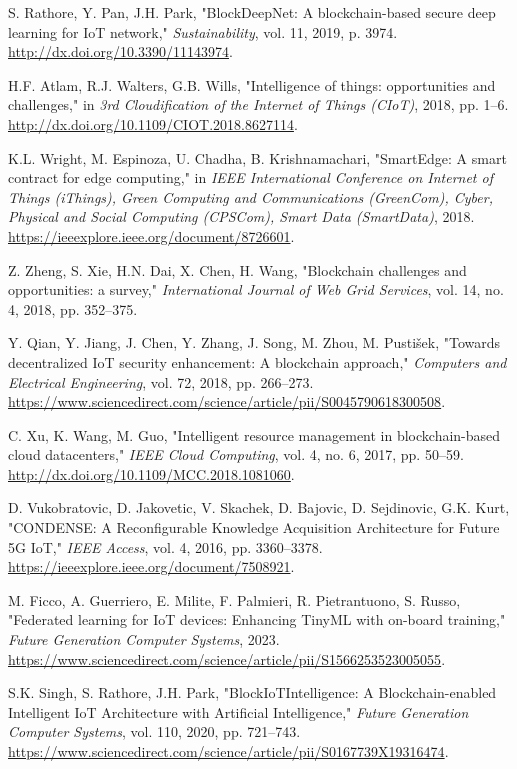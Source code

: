 \documentclass[12pt, oneside]{report}
\begin{document}

\begin{thebibliography}{20}

S. Rathore, Y. Pan, J.H. Park, "BlockDeepNet: A blockchain-based secure deep learning for IoT network," \textit{Sustainability}, vol. 11, 2019, p. 3974. \url{http://dx.doi.org/10.3390/11143974}.

H.F. Atlam, R.J. Walters, G.B. Wills, "Intelligence of things: opportunities and challenges," in \textit{3rd Cloudification of the Internet of Things (CIoT)}, 2018, pp. 1–6. \url{http://dx.doi.org/10.1109/CIOT.2018.8627114}.

K.L. Wright, M. Espinoza, U. Chadha, B. Krishnamachari, "SmartEdge: A smart contract for edge computing," in \textit{IEEE International Conference on Internet of Things (iThings), Green Computing and Communications (GreenCom), Cyber, Physical and Social Computing (CPSCom), Smart Data (SmartData)}, 2018. \url{https://ieeexplore.ieee.org/document/8726601}.

Z. Zheng, S. Xie, H.N. Dai, X. Chen, H. Wang, "Blockchain challenges and opportunities: a survey," \textit{International Journal of Web Grid Services}, vol. 14, no. 4, 2018, pp. 352–375.

Y. Qian, Y. Jiang, J. Chen, Y. Zhang, J. Song, M. Zhou, M. Pustišek, "Towards decentralized IoT security enhancement: A blockchain approach," \textit{Computers and Electrical Engineering}, vol. 72, 2018, pp. 266–273. \url{https://www.sciencedirect.com/science/article/pii/S0045790618300508}.

C. Xu, K. Wang, M. Guo, "Intelligent resource management in blockchain-based cloud datacenters," \textit{IEEE Cloud Computing}, vol. 4, no. 6, 2017, pp. 50–59. \url{http://dx.doi.org/10.1109/MCC.2018.1081060}.

D. Vukobratovic, D. Jakovetic, V. Skachek, D. Bajovic, D. Sejdinovic, G.K. Kurt, "CONDENSE: A Reconfigurable Knowledge Acquisition Architecture for Future 5G IoT," \textit{IEEE Access}, vol. 4, 2016, pp. 3360–3378. \url{https://ieeexplore.ieee.org/document/7508921}.

M. Ficco, A. Guerriero, E. Milite, F. Palmieri, R. Pietrantuono, S. Russo, "Federated learning for IoT devices: Enhancing TinyML with on-board training," \textit{Future Generation Computer Systems}, 2023. \url{https://www.sciencedirect.com/science/article/pii/S1566253523005055}.

S.K. Singh, S. Rathore, J.H. Park, "BlockIoTIntelligence: A Blockchain-enabled Intelligent IoT Architecture with Artificial Intelligence," \textit{Future Generation Computer Systems}, vol. 110, 2020, pp. 721–743. \url{https://www.sciencedirect.com/science/article/pii/S0167739X19316474}.
  
\end{thebibliography}



\end{document}
